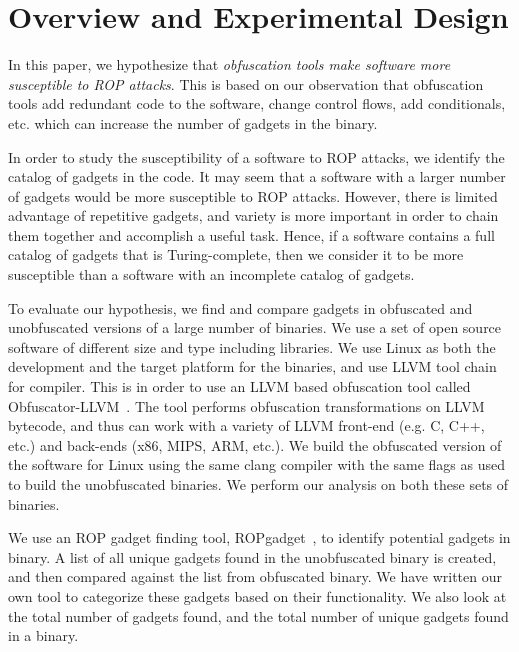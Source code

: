 \section{Overview and Experimental Design}
\label{sec:design}

In this paper, we hypothesize that \textit{obfuscation tools make software 
more susceptible to ROP attacks}. This is based on our observation that 
obfuscation tools add redundant code to the software, change control 
flows, add conditionals, etc. which can increase the number of gadgets in 
the binary.

In order to study the susceptibility of a software to ROP attacks, we 
identify the catalog of gadgets in the code. It may seem that a software 
with a larger number of gadgets would be more susceptible to ROP attacks. 
However, there is limited advantage of repetitive gadgets, and variety is 
more important in order to chain them together and accomplish a useful 
task. Hence, if a software contains a full catalog of gadgets that is  
Turing-complete, then we consider it to be more susceptible than a 
software with an incomplete catalog of gadgets. 

To evaluate our hypothesis, we find and compare gadgets in obfuscated and 
unobfuscated versions of a large number of binaries. We use a set of open 
source software of different size and type including libraries. We use 
Linux as both the development and the target platform for the binaries, 
and use LLVM tool chain for compiler. This is in order to use an LLVM 
based obfuscation tool called Obfuscator-LLVM~\cite{webLLVMobfusc}. The 
tool performs obfuscation transformations on LLVM bytecode, and thus can 
work with a variety of LLVM front-end (e.g. C, C++, etc.) and back-ends 
(x86, MIPS, ARM, etc.). We build the obfuscated version of the software 
for Linux using the same clang compiler with the same flags as used to 
build the unobfuscated binaries. We perform our analysis on both these 
sets of binaries. 

We use an ROP gadget finding tool, ROPgadget~\cite{webRopgadget}, to 
identify potential gadgets in binary. A list of all unique gadgets found 
in the unobfuscated binary is created, and then compared against the list 
from obfuscated binary. We have written our own tool to categorize these 
gadgets based on their functionality. We also look at the total number of 
gadgets found, and the total number of unique gadgets found in a binary.


